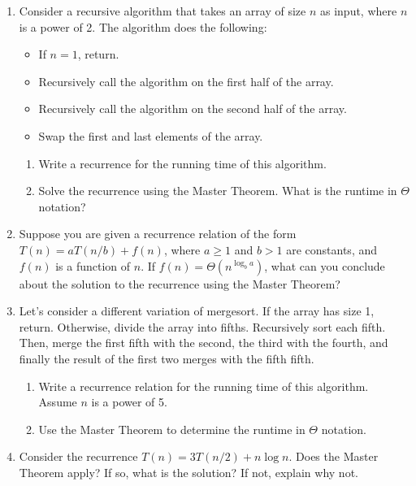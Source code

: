\documentclass{article}
\begin{document}
\begin{enumerate}
    \item  Consider a recursive algorithm that takes an array of size $n$ as input, where $n$ is a power of 2. The algorithm does the following:
    \begin{itemize}
        \item If $n=1$, return.
        \item Recursively call the algorithm on the first half of the array.
        \item Recursively call the algorithm on the second half of the array.
        \item Swap the first and last elements of the array.
    \end{itemize}
    \begin{enumerate}
        \item Write a recurrence for the running time of this algorithm.
        \item Solve the recurrence using the Master Theorem.  What is the runtime in $\Theta$ notation?
    \end{enumerate}

    \item  Suppose you are given a recurrence relation of the form $T(n) = aT(n/b) + f(n)$, where $a \ge 1$ and $b > 1$ are constants, and $f(n)$ is a function of $n$.  If $f(n) = \Theta(n^{\log_b a})$, what can you conclude about the solution to the recurrence using the Master Theorem?

    \item  Let's consider a different variation of mergesort.  If the array has size 1, return.  Otherwise, divide the array into fifths. Recursively sort each fifth. Then, merge the first fifth with the second, the third with the fourth, and finally the result of the first two merges with the fifth fifth.  
    \begin{enumerate}
        \item Write a recurrence relation for the running time of this algorithm.  Assume $n$ is a power of 5.
        \item Use the Master Theorem to determine the runtime in $\Theta$ notation.
    \end{enumerate}

    \item Consider the recurrence $T(n) = 3T(n/2) + n\log n$.  Does the Master Theorem apply? If so, what is the solution? If not, explain why not.


\end{enumerate}
\end{document}
